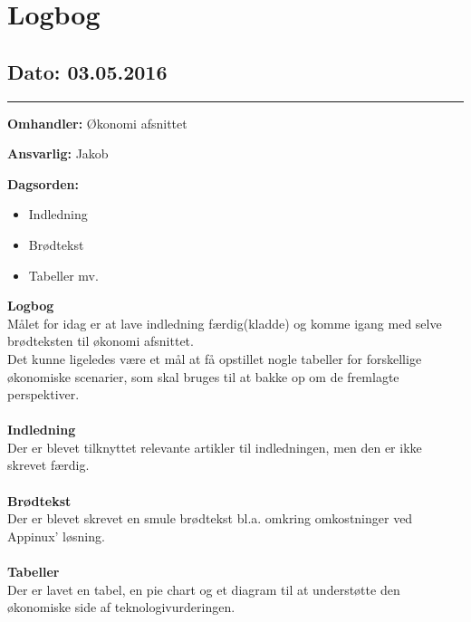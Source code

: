 \chapter{Logbog}

\section{Dato: 03.05.2016}
\hrule

\textbf{Omhandler:} Økonomi afsnittet

\textbf{Ansvarlig:} Jakob

\textbf{Dagsorden:}
\begin{itemize}
	\item Indledning
	\item Brødtekst
	\item Tabeller mv.
\end{itemize}

\textbf{Logbog}
\\
Målet for idag er at lave indledning færdig(kladde) og komme igang med selve brødteksten til økonomi afsnittet. \\
Det kunne ligeledes være et mål at få opstillet nogle tabeller for forskellige økonomiske scenarier, som skal bruges til at bakke op om de fremlagte perspektiver. 
\\ \\

\textbf{Indledning}
\\
Der er blevet tilknyttet relevante artikler til indledningen, men den er ikke skrevet færdig.
\\ \\

\textbf{Brødtekst}
\\
Der er blevet skrevet en smule brødtekst bl.a. omkring omkostninger ved Appinux' løsning.
\\ \\

\textbf{Tabeller}
\\
Der er lavet en tabel, en pie chart og et diagram til at understøtte den økonomiske side af teknologivurderingen.
\\ \\